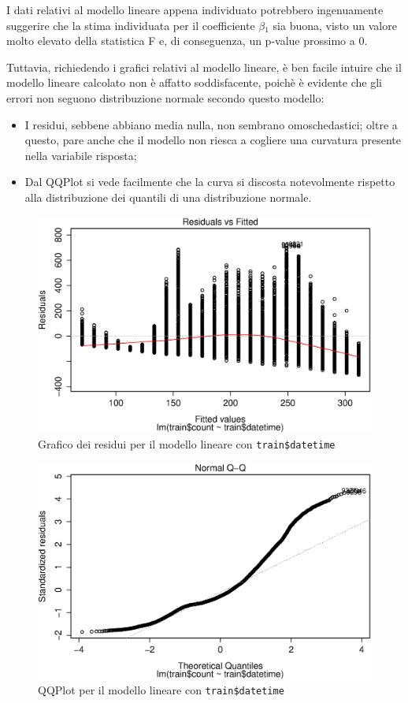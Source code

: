 I dati relativi al modello lineare appena individuato potrebbero ingenuamente
suggerire che la stima individuata per il coefficiente $\beta{}_1$ sia buona,
visto un valore molto elevato della statistica F e, di conseguenza, un p-value
prossimo a 0.

Tuttavia, richiedendo i grafici relativi al modello lineare, è ben facile
intuire che il modello lineare calcolato non è affatto soddisfacente, poichè è
evidente che gli errori non seguono distribuzione normale secondo
questo modello:

\begin{itemize}
\item I residui, sebbene abbiano media nulla, non sembrano omoschedastici;
  oltre a questo, pare anche che il modello non riesca a cogliere una
  curvatura presente nella variabile risposta;
\item Dal QQPlot si vede facilmente che la curva si discosta notevolmente
  rispetto alla distribuzione dei quantili di una distribuzione normale.
\end{itemize}

\begin{figure}[H]
  \centering
  \includegraphics[width=.7\columnwidth]{images/simple-linear-model-plot.eps}
  \caption{Grafico dei residui per il modello lineare con
  \texttt{train\$datetime}}\label{fig:simpl-mod-lin-residuals}
\end{figure}

\begin{figure}[H]
  \centering
  \includegraphics[width=.7\columnwidth]{images/simplest-linear-model-qqplot.eps}
  \caption{QQPlot per il modello lineare con
  \texttt{train\$datetime}}\label{fig:simpl-mod-lin-qqplot}
\end{figure}

